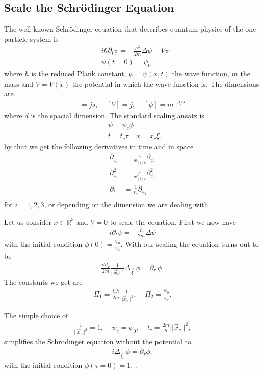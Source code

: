 \documentclass[a4paper]{article}
\begin{document}
\subsection{Scale the Schrödinger Equation}
The well known Schrödinger equation that describes quantum physics of the one
particle system is
\begin{align}
    &i\hbar \partial_t\psi = -\frac{\hbar^2}{2m}\Delta \psi + V\psi \nonumber\\
    &\psi(t=0) =\psi_0
\end{align}
where $\hbar$ is the reduced Plank constant, $\psi=\psi(x, t)$ the wave function,
$m$ the mass and $V = V(x)$ the potential in which the wave function is. The
dimensions are
\begin{align}
    [\hbar] = js, \;\;\;\; [V] = j,  \;\;\;\; [\psi]= m^{-d/2}
\end{align}
where $d$ is the spacial dimension. The standard scaling ansatz is
\begin{align}
    &\psi = \psi_c \phi \\
    &t = t_c \tau \;\;\;\; x = x_c \xi,
\end{align}
by that we get the following derivatives in time and in space
\begin{align}
    \partial_{x_i} &=\frac{1}{x_{(i)c}} \partial_{\psi_i} \\
    \partial^2_{x_i} &=\frac{1}{x_{(i)c}^2} \partial_{\psi_i}^2\\
    \partial_{t} &=\frac{1}{t_c} \partial_{\psi_i} \\
\end{align}
for $i = 1, 2, 3$, or depending on the dimension we are dealing with.

Let us consider $x\in \mathbb{R}^3$ and $V = 0$ to scale the equation. First
we now have
\begin{align}
    i \partial_t\psi = -\frac{\hbar}{2m}\Delta \psi
\end{align}
with the initial condition $\phi(0) = \frac{\psi_0}{\psi_c}$. With our scaling the equation turns out to be
\begin{align}
    \frac{i\hbar t_c}{2m}\frac{1}{||\vec{x}_c||^2}\Delta_{\vec{\xi}}\ \phi =
    \partial_\tau\ \phi.
\end{align}
The constants we get are
\begin{align}
    \Pi_1 = \frac{t_c\hbar}{2m}\frac{1}{||\vec{x}_c||^2}, \;\;\;\; \Pi_2 =
    \frac{\psi_0}{\psi_c}.
\end{align}

The simple choice of
\begin{align}
    \frac{1}{||\vec{x}_c||^2} = 1, \;\;\;\; \psi_c = \psi_0, \;\;\;\; t_c =
    \frac{2m}{\hbar}||\vec{x}_c||^2,
\end{align}
simplifies the Schrodinger equation without the potential to
\begin{align}
    i\Delta_{\vec{\xi}}\ \phi = \partial_\tau \phi,
\end{align}
with the initial condition $\phi(\tau=0) = 1$.
.
\end{document}
